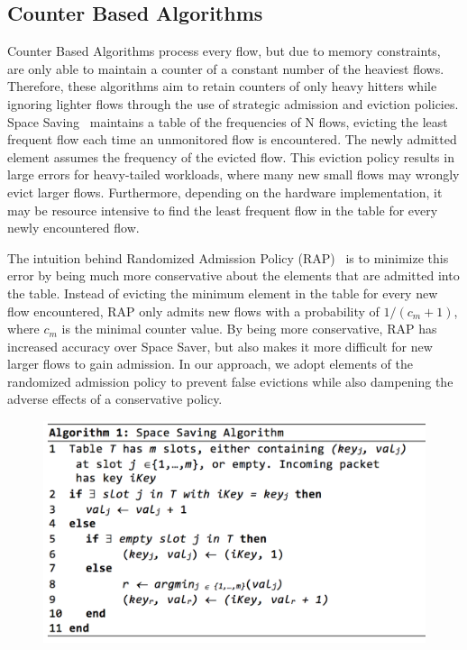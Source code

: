 \subsection{Counter Based Algorithms}
Counter Based Algorithms process every flow, but due to memory constraints, are only able to maintain a counter of a constant number of the heaviest flows. Therefore, these algorithms aim to retain counters of only heavy hitters while ignoring lighter flows through the use of strategic admission and eviction policies. Space Saving~\cite{spacesaving} maintains a table of the frequencies of N flows, evicting the least frequent flow each time an unmonitored flow is encountered. The newly admitted element assumes the frequency of the evicted flow. This eviction policy results in large errors for heavy-tailed workloads, where many new small flows may wrongly evict larger flows. Furthermore, depending on the hardware implementation, it may be resource intensive to find the least frequent flow in the table for every newly encountered flow. 

The intuition behind Randomized Admission Policy (RAP)~\cite{rap} is to minimize this error by being much more conservative about the elements that are admitted into the table. Instead of evicting the minimum element in the table for every new flow encountered, RAP only admits new flows with a probability of $1/(c_m + 1)$, where $c_m$ is the minimal counter value. By being more conservative, RAP has increased accuracy over Space Saver, but also makes it more difficult for new larger flows to gain admission. In our approach, we adopt elements of the randomized admission policy to prevent false evictions while also dampening the adverse effects of a conservative policy. 

\begin{figure}[t]
  \centering
    \includegraphics[scale=0.5]{alg1}
     \label{fig:bp-image}
\end{figure}

